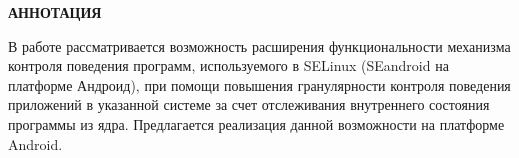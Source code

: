 \documentclass[russian,utf8,pointsubsection,emptystyle, 12pt]{eskdtext}
\begin{document}
\maketitle


\large{\textbf{АННОТАЦИЯ}}

В работе рассматривается возможность расширения функциональности
механизма контроля поведения программ, используемого в SELinux
(SEandroid на платформе Андроид), при помощи повышения гранулярности
контроля поведения приложений в указанной системе за счет отслеживания
внутреннего состояния программы из ядра. Предлагается реализация данной
возможности на платформе Android.

\newpage

\tableofcontents
\newpage

%






% 
\end{document}
